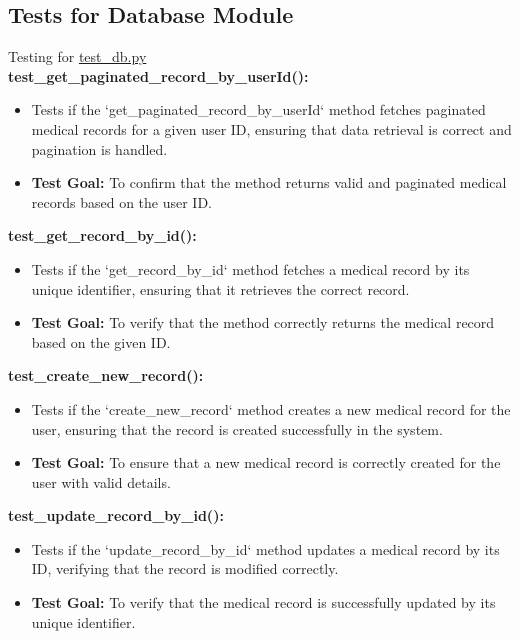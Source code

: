 \documentclass[12pt, titlepage]{article}
\begin{document}
\begin{enumerate}
\subsection{Tests for Database Module}
Testing for \href{https://github.com/RezaJodeiri/CXR-Capstone/blob/main/src/backend/test/test_db.py}{test\_db.py} \\ 

\textbf{test\_get\_paginated\_record\_by\_userId():}  
\begin{itemize}
    \item Tests if the `get\_paginated\_record\_by\_userId` method fetches paginated medical records for a given user ID, ensuring that data retrieval is correct and pagination is handled.
    \item \textbf{Test Goal:} To confirm that the method returns valid and paginated medical records based on the user ID.
    \newline
\end{itemize}

\textbf{test\_get\_record\_by\_id():}  
\begin{itemize}
    \item Tests if the `get\_record\_by\_id` method fetches a medical record by its unique identifier, ensuring that it retrieves the correct record.
    \item \textbf{Test Goal:} To verify that the method correctly returns the medical record based on the given ID.
    \newline
\end{itemize}

\textbf{test\_create\_new\_record():}  
\begin{itemize}
    \item Tests if the `create\_new\_record` method creates a new medical record for the user, ensuring that the record is created successfully in the system.
    \item \textbf{Test Goal:} To ensure that a new medical record is correctly created for the user with valid details.
    \newline
\end{itemize}

\textbf{test\_update\_record\_by\_id():}  
\begin{itemize}
    \item Tests if the `update\_record\_by\_id` method updates a medical record by its ID, verifying that the record is modified correctly.
    \item \textbf{Test Goal:} To verify that the medical record is successfully updated by its unique identifier.
    \newline
\end{itemize}


\end{enumerate}
\end{document}
